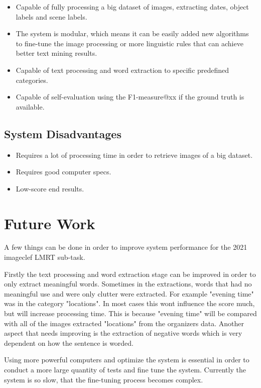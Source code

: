 \begin{itemize}
    \itemsep0em
    \item Capable of fully processing a big dataset of images, extracting dates, object labels and scene labels.
    \item The system is modular, which means it can be easily added new algorithms to fine-tune the image processing or more linguistic rules that can achieve better text mining results.
    \item Capable of text processing and word extraction to specific predefined categories.
    \item Capable of self-evaluation using the F1-measure@xx if the ground truth is available.
\end{itemize}


\subsection{System Disadvantages}

\begin{itemize}
    \itemsep0em
    \item Requires a lot of processing time in order to retrieve images of a big dataset.
    \item Requires good computer specs.
    \item Low-score end results.
\end{itemize}

\section{Future Work}

A few things can be done in order to improve system performance for the 2021 imageclef LMRT sub-task.

Firstly the text processing and word extraction stage can be improved in order to only extract meaningful words. Sometimes in the extractions, words that had no meaningful use and were only clutter were extracted. For example "evening time" was in the category "locations". In most cases this wont influence the score much, but will increase processing time. This is because "evening time" will be compared with all of the images extracted "locations" from the organizers data. Another aspect that needs improving is the extraction of negative words which is very dependent on how the sentence is worded.

Using more powerful computers and optimize the system is essential in order to conduct a more large quantity of tests and fine tune the system. Currently the system is so slow, that the fine-tuning process becomes complex.

